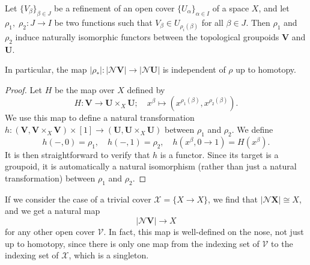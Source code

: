\documentclass[a4paper,openany]{scrbook}
\newcommand{\nerve}{\mathcal N}
\begin{document}
\begin{prop} \label{prop:refinementhomotopyinvariant}
Let $\{V_\beta\}_{\beta \in J}$ be a refinement of an open cover $\{U_\alpha\}_{\alpha \in I}$ of a space $X$, and let $\rho_1,\;\rho_2\colon J \to I$ be two functions such that $V_\beta \in U_{\rho_i(\beta)}$ for all $\beta \in J$. Then $\rho_1$ and $\rho_2$ induce naturally isomorphic functors between the topological groupoids $\mathbf V$ and $\mathbf U$.

In particular, the map $|\rho_*|\colon |\nerve\mathbf V| \to |\nerve \mathbf U|$ is independent of $\rho$ up to homotopy.
\end{prop}
\begin{proof}
Let $H$ be the map over $X$ defined by
\[
H\colon \mathbf V \to \mathbf U \times_X \mathbf U; \quad x^\beta \mapsto (x^{\rho_1(\beta)},x^{\rho_2(\beta)}).
\]
We use this map to define a natural transformation $h\colon (\mathbf V,\mathbf V \times_X \mathbf V) \times [1] \to (\mathbf U,\mathbf U \times_X \mathbf U)$ between $\rho_1$ and $\rho_2$. We define
\[
h(-,0) = \rho_1, \quad h(-,1) = \rho_2, \quad h(x^\beta,0 \to 1) = H(x^\beta).
\]
It is then straightforward to verify that $h$ is a functor. Since its target is a groupoid, it is automatically a natural isomorphism (rather than just a natural transformation) between $\rho_1$ and $\rho_2$.
\end{proof}

If we consider the case of a trivial cover $\mathcal X = \{X \to X\}$, we find that $|\nerve \mathbf X| \cong X$, and we get a natural map
\[
|\nerve\mathbf V| \to X
\]
for any other open cover $\mathcal V$. In fact, this map is well-defined on the nose, not just up to homotopy, since there  is only one map from the indexing set of $\mathcal V$ to the indexing set of $\mathcal X$, which is a singleton.
\end{document}
